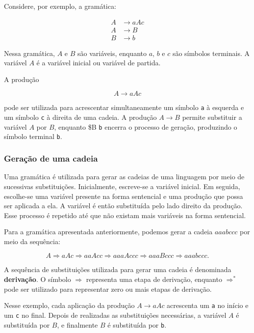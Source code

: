 \documentclass[
  brazilian,
  letterpaper,
]{book}
\theoremstyle{plain}
\theoremstyle{definition}
\theoremstyle{remark}
\begin{document}
Considere, por exemplo, a gramática:

\[
\begin{aligned}
A &\rightarrow aAc\\
A &\rightarrow B\\
B &\rightarrow b
\end{aligned}
\]

Nessa gramática, \(A\) e \(B\) são variáveis, enquanto \(a\), \(b\) e
\(c\) são símbolos terminais. A variável \(A\) é a variável inicial ou
variável de partida.

A produção

\[
A \rightarrow aAc
\]

pode ser utilizada para acrescentar simultaneamente um símbolo
\texttt{a} à esquerda e um símbolo \texttt{c} à direita de uma cadeia. A
produção \(A \rightarrow B\) permite substituir a variável \(A\) por
\(B\), enquanto \$B \rightarrow \texttt{b} encerra o processo de
geração, produzindo o símbolo terminal \texttt{b}.

\subsubsection{Geração de uma cadeia}\label{gerauxe7uxe3o-de-uma-cadeia}

Uma gramática é utilizada para gerar as cadeias de uma linguagem por
meio de sucessivas substituições. Inicialmente, escreve-se a variável
inicial. Em seguida, escolhe-se uma variável presente na forma
sentencial e uma produção que possa ser aplicada a ela. A variável é
então substituída pelo lado direito da produção. Esse processo é
repetido até que não existam mais variáveis na forma sentencial.

Para a gramática apresentada anteriormente, podemos gerar a cadeia
\(aaabccc\) por meio da sequência:

\[
A
\Rightarrow aAc
\Rightarrow aaAcc
\Rightarrow aaaAccc
\Rightarrow aaaBccc
\Rightarrow aaabccc.
\]

A sequência de substituições utilizada para gerar uma cadeia é
denominada \textbf{derivação}. O símbolo \(\Rightarrow\) representa uma
etapa de derivação, enquanto \(\Rightarrow^*\) pode ser utilizado para
representar zero ou mais etapas de derivação.

Nesse exemplo, cada aplicação da produção \(A \rightarrow aAc\)
acrescenta um \texttt{a} no início e um \texttt{c} no final. Depois de
realizadas as substituições necessárias, a variável \(A\) é substituída
por \(B\), e finalmente \(B\) é substituída por \texttt{b}.
\end{document}

